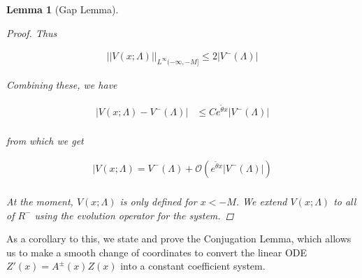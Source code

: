\documentclass[12pt]{article}
\newtheorem{lemma}{Lemma}
\begin{document}
\begin{lemma}[Gap Lemma]
\begin{proof}
Thus

\begin{align*}
||V(x; \Lambda)||_{L^\infty(-\infty, -M]} \leq 2 |V^-(\Lambda)|
\end{align*}

Combining these, we have

\begin{align*}
|V(x; \Lambda) - V^-(\Lambda)| &\leq C e^{\tilde{\theta} x}|V^-(\Lambda)| \\
\end{align*}

from which we get

\begin{align*}
|V(x; \Lambda) = V^-(\Lambda) + \mathcal{O}( e^{\tilde{\theta} x}|V^-(\Lambda)| )\\
\end{align*}

At the moment, $V(x; \Lambda)$ is only defined for $x < -M$. We extend $V(x; \Lambda)$ to all of $R^-$ using the evolution operator for the system.

\end{proof}
\end{lemma}

As a corollary to this, we state and prove the Conjugation Lemma, which allows us to make a smooth change of coordinates to convert the linear ODE $Z'(x) = A^\pm(x) Z(x)$ into a constant coefficient system.
\end{document}
